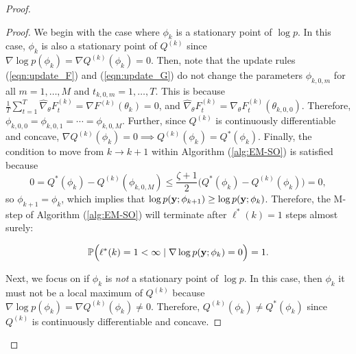 \begin{proof}
\begin{proof}
We begin with the case where $\phi_k$ is a stationary point of $\log p$. In this case, $\phi_k$ is also a stationary point of $Q^{(k)}$ since $\nabla \log p(\phi_k) = \nabla Q^{(k)}(\phi_k) = 0$. Then, note that the update rules (\ref{eqn:update_F}) and (\ref{eqn:update_G}) do not change the parameters $\phi_{k,0,m}$ for all $m = 1,\ldots,M$ and $t_{k,0,m} = 1,\ldots,T$. This is because $\frac{1}{T} \sum_{t=1}^T \widehat \nabla_\theta F^{(k)}_t = \nabla F^{(k)}(\theta_k) = 0$, and $\widehat \nabla_\theta F^{(k)}_t = \nabla_\theta F^{(k)}_t(\theta_{k,0,0})$. Therefore, $\phi_{k,0,0} = \phi_{k,0,1} = \cdots = \phi_{k,0,M}$. Further, since $Q^{(k)}$ is continuously differentiable and concave, $\nabla Q^{(k)}(\phi_k) = 0 \implies Q^{(k)}(\phi_k) = Q^*(\phi_k)$. Finally, the condition to move from $k \to k+1$ within Algorithm (\ref{alg:EM-SO}) is satisfied because 
%
$$0 = Q^*(\phi_k) - Q^{(k)}(\phi_{k,0,M}) \leq \frac{\zeta+1}{2} \Big(Q^*(\phi_k) - Q^{(k)}(\phi_{k})\Big) = 0,$$
%
so $\phi_{k+1} = \phi_{k}$, which implies that $\log p(\mathbf{y};\phi_{k+1}) \geq \log p(\mathbf{y};\phi_k)$. Therefore, the M-step of Algorithm (\ref{alg:EM-SO}) will terminate after $\ell^*(k) = 1$ steps almost surely:

$$\mathbb{P}\Big(\ell^*(k) = 1 < \infty \mid \nabla \log p(\mathbf{y};\phi_k) = 0\Big) = 1.$$

Next, we focus on if $\phi_k$ is \textit{not} a stationary point of $\log p$. In this case, then $\phi_k$ it must not be a local maximum of $Q^{(k)}$ because $\nabla \log p(\phi_k) = \nabla Q^{(k)}(\phi_k) \neq 0$.
Therefore, $Q^{(k)}(\phi_{k}) \neq Q^{*}(\phi_{k})$ since $Q^{(k)}$ is continuously differentiable and concave. %


\end{proof}
\end{proof}
